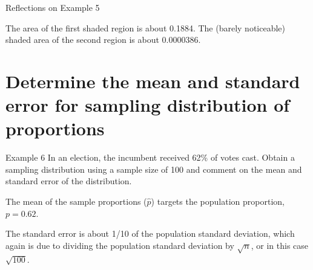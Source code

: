 \documentclass[t]{beamer}
\begin{document}
\begin{frame}{Reflections on Example 5}
\begin{minipage}{0.45\textwidth}
\end{minipage}
\hspace{0.25cm}
\begin{minipage}{0.45\textwidth}
\end{minipage}	\smallskip
The area of the first shaded region is about 0.1884. The (barely noticeable) shaded area of the second region is about 0.0000386.
\end{frame}


\section{Determine the mean and standard error for sampling distribution of proportions}

\begin{frame}{Example 6}
In an election, the incumbent received 62\% of votes cast. Obtain a sampling distribution using a sample size of 100 and comment on the mean and standard error of the distribution.	\newline\\	\pause

The mean of the sample proportions ($\hat{p}$) targets the population proportion, $p = 0.62$.	\newline\\	\pause

The standard error is about 1/10 of the population standard deviation, which again is due to dividing the population standard deviation by $\sqrt{n}$, or in this case $\sqrt{100}$.
\end{frame}
\end{document}
